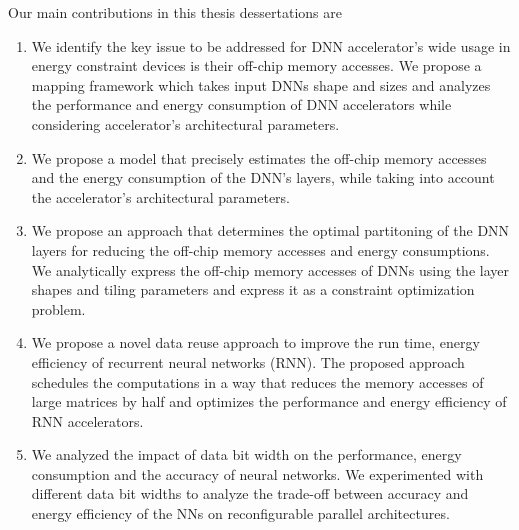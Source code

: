 \documentclass[a4paper,10pt]{article}
\begin{document}
Our main contributions in this thesis dessertations are
\begin{enumerate}
	\item  We identify the key issue to be addressed for DNN accelerator's wide usage in energy constraint devices is their off-chip memory accesses. We propose a mapping framework which takes input DNNs shape and sizes and analyzes the performance and energy consumption of DNN accelerators while considering accelerator's architectural parameters.
	\item We propose a model that precisely estimates the off-chip memory accesses and the energy consumption of the DNN's layers, while taking into account the accelerator's architectural parameters.
	\item We propose an approach that determines the optimal partitoning of the DNN layers for reducing the off-chip memory accesses and energy consumptions. We analytically express the off-chip memory accesses of DNNs  using the layer shapes and tiling parameters and express it as a constraint optimization problem.
	\item We propose a novel data reuse approach to improve the run time, energy efficiency of recurrent neural networks (RNN). The proposed approach schedules the computations in a way that reduces the memory accesses of large matrices by half and optimizes the performance and energy efficiency of RNN accelerators.
	\item We analyzed the impact of data bit width on the performance, energy consumption and the accuracy of neural networks. We experimented with different data bit widths to analyze the trade-off between accuracy and energy efficiency of the NNs on reconfigurable parallel architectures.
\end{enumerate}
\end{document}
